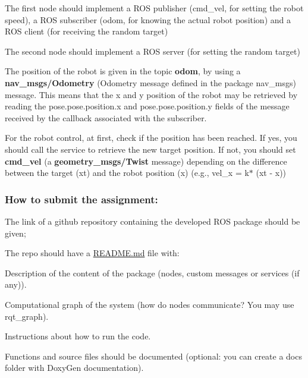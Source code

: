 \begin{DoxyItemize}
\item The first node should implement a R\+OS publisher (cmd\+\_\+vel, for setting the robot speed), a R\+OS subscriber (odom, for knowing the actual robot position) and a R\+OS client (for receiving the random target)
\item The second node should implement a R\+OS server (for setting the random target)
\item The position of the robot is given in the topic {\bfseries odom}, by using a {\bfseries nav\+\_\+msgs/\+Odometry} (Odometry message defined in the package nav\+\_\+msgs) message. This means that the x and y position of the robot may be retrieved by reading the pose.\+pose.\+position.\+x and pose.\+pose.\+position.\+y fields of the message received by the callback associated with the subscriber.
\item For the robot control, at first, check if the position has been reached. If yes, you should call the service to retrieve the new target position. If not, you should set {\bfseries cmd\+\_\+vel} (a {\bfseries geometry\+\_\+msgs/\+Twist} message) depending on the difference between the target (xt) and the robot position (x) (e.\+g., vel\+\_\+x = k$\ast$ (xt -\/ x))
\end{DoxyItemize}

\subsubsection*{How to submit the assignment\+:}


\begin{DoxyItemize}
\item The link of a github repository containing the developed R\+OS package should be given;
\item The repo should have a \hyperlink{_r_e_a_d_m_e_8md}{R\+E\+A\+D\+M\+E.\+md} file with\+:
\begin{DoxyItemize}
\item Description of the content of the package (nodes, custom messages or services (if any)).
\item Computational graph of the system (how do nodes communicate? You may use rqt\+\_\+graph).
\item Instructions about how to run the code.
\end{DoxyItemize}
\item Functions and source files should be documented (optional\+: you can create a docs folder with Doxy\+Gen documentation).
\end{DoxyItemize}

